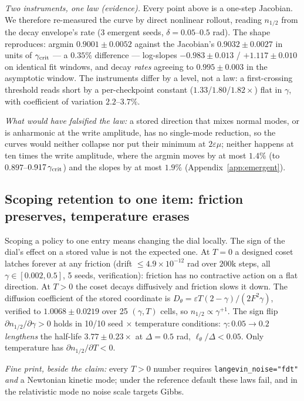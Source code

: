 \documentclass{article}
\begin{document}
\emph{Two instruments, one law (evidence).} Every point above is a one-step Jacobian. We therefore re-measured the curve by direct nonlinear rollout, reading $n_{1/2}$ from the decay envelope's rate (3 emergent seeds, $\delta=0.05$--$0.5$ rad). The shape reproduces: argmin $0.9001\pm0.0052$ against the Jacobian's $0.9032\pm0.0027$ in units of $\gamma_{\rm crit}$ --- a $0.35\%$ difference --- log-slopes $-0.983\pm0.013$ / $+1.117\pm0.010$ on identical fit windows, and decay \emph{rates} agreeing to $0.995\pm0.003$ in the asymptotic window. The instruments differ by a level, not a law: a first-crossing threshold reads short by a per-checkpoint constant ($1.33$/$1.80$/$1.82\times$) flat in $\gamma$, with coefficient of variation $2.2$--$3.7\%$. {\emph{What would have falsified the law:} a stored direction that mixes normal modes, or is anharmonic at the write amplitude, has no single-mode reduction, so the curves would neither collapse nor put their minimum at $2\varepsilon\mu$; neither happens at ten times the write amplitude, where the argmin moves by at most $1.4\%$ (to $0.897$--$0.917\,\gamma_{\rm crit}$) and the slopes by at most $1.9\%$ (Appendix~\ref{app:emergent}).\par}

\subsection{Scoping retention to one item: friction preserves, temperature erases}\label{sec:vault}

Scoping a policy to one entry means changing the dial locally. The sign of the dial's effect on a stored value is not the expected one. At $T=0$ a designed coset latches forever at any friction (drift $\le4.9\times10^{-12}$ rad over $200$k steps, all $\gamma\in[0.002,0.5]$, 5 seeds, verification): friction has no contractive action on a flat direction. At $T>0$ the coset decays diffusively and friction slows it down. The diffusion coefficient of the stored coordinate is $D_\theta=\varepsilon T(2-\gamma)/(2F^2\gamma)$, verified to $1.0068\pm0.0219$ over 25 $(\gamma,T)$ cells, so $n_{1/2}\propto\gamma^{+1}$. The sign flip $\partial n_{1/2}/\partial\gamma>0$ holds in 10/10 seed $\times$ temperature conditions: $\gamma:0.05\to0.2$ \emph{lengthens} the half-life $3.77\pm0.23\times$ at $\Delta=0.5$ rad, $\ell_\theta/\Delta<0.05$. Only temperature has $\partial n_{1/2}/\partial T<0$. {\emph{Fine print, beside the claim:} every $T>0$ number requires \texttt{langevin\_noise="fdt"} \emph{and} a Newtonian kinetic mode; under the reference default these laws fail, and in the relativistic mode no noise scale targets Gibbs.\par}
\end{document}

